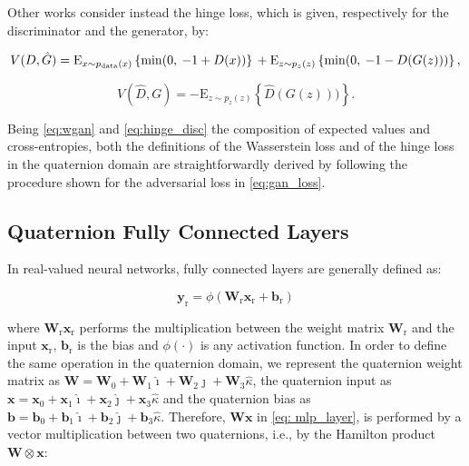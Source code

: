 \documentclass[graybox]{svmult}
\def\x{{\mathbf x}}														\def\q{{\mathbf q}}														\def\y{{\mathbf y}}														\def\z{{\mathbf z}}														\def\C{{\mathbf C}}														\def\E{\text{E}} 									\def\W{{\mathbf W}}														\def\ii{{\hat{\imath}}}												\def\ij{{\hat{\jmath}}}												\def\ik{{\hat{\kappa}}}												\def\bH{\mathbb{H}}														\def\bQ{\mathbb{Q}}														\def\bR{\mathbb{R}}														\def\cD{{\cal D}}															\def\cL{{\cal L}}															\def\cN{{\cal N}}															\newcommand{\beps}{\boldsymbol{\epsilon}}					  \newcommand{\bmu}{\boldsymbol{\mu}}					  \newcommand{\bphi}{\boldsymbol{\phi}}				  \newcommand{\bth}{\boldsymbol{\theta}}				\newcommand{\bsigma}{\boldsymbol{\sigma}} 		\newcommand{\bSigma}{\boldsymbol{\Sigma}} 		\newcommand{\tT}{^{\text{T}}} 								\newcommand{\tH}{^{\text{H}}} 								\DeclareMathOperator{\diag}{diag} 									\DeclareMathOperator{\Tr}{Tr}								\DeclareMathOperator{\var}{var}
\begin{document}
Other works \cite{Miyato2018SpectralNF, Chen2019SelfSupervisedGV} consider instead the hinge loss, which is given, respectively for the discriminator and the generator, by:

\begin{equation}
\label{eq:hinge_disc}
V(D, \hat{G}) = \E_{x\sim p_{\text{data}}(x)}\left\{\min (0, \: - 1 + D(x))\right\} \\
    + \E_{z\sim p_z(z)}\left\{\min (0, \: - 1 - D(G(z)))\right\},
\end{equation}

\begin{equation}
\label{eq:hinge_gen}
V(\hat{D},G) = - \E_{z\sim p_z(z)}\left\{\hat{D}(G(z)))\right\}.
\end{equation}

Being \eqref{eq:wgan} and \eqref{eq:hinge_disc} the composition of expected values and cross-entropies, both the definitions of the Wasserstein loss and of the hinge loss in the quaternion domain are straightforwardly derived by following the procedure shown for the adversarial loss in \eqref{eq:gan_loss}.


\subsection{Quaternion Fully Connected Layers}

\noindent In real-valued neural networks, fully connected layers are generally defined as:

\begin{equation}
\label{eq: mlp_layer}
    \mathbf{y}_{\text{r}} = \phi(\mathbf{W}_{\text{r}}\mathbf{x}_{\text{r}} + \mathbf{b}_{\text{r}})
\end{equation}

\noindent where $\mathbf{W}_{\text{r}}\mathbf{x}_{\text{r}}$ performs the multiplication between the weight matrix $\mathbf{W}_{\text{r}}$ and the input $\mathbf{x}_{\text{r}}$, $\mathbf{b}_{\text{r}}$ is the bias and $\phi(\cdot)$ is any activation function.
In order to define the same operation in the quaternion domain, we represent the  quaternion weight matrix as $\mathbf{W} = \mathbf{W}_0 + \mathbf{W}_1 \ii + \mathbf{W}_2 \ij + \mathbf{W}_3 \ik$, the quaternion input as $ \x = \x_0 + \x_1 \ii + \x_2 \ij + \x_3 \ik$ and the quaternion bias as $\mathbf{b} = \mathbf{b}_0 + \mathbf{b}_1 \ii + \mathbf{b}_2 \ij + \mathbf{b}_3 \ik$. Therefore, $\mathbf{W}\mathbf{x}$ in \eqref{eq: mlp_layer}, is performed by a vector multiplication between two quaternions, i.e., by the Hamilton product $\W \otimes \x$:
\end{document}
